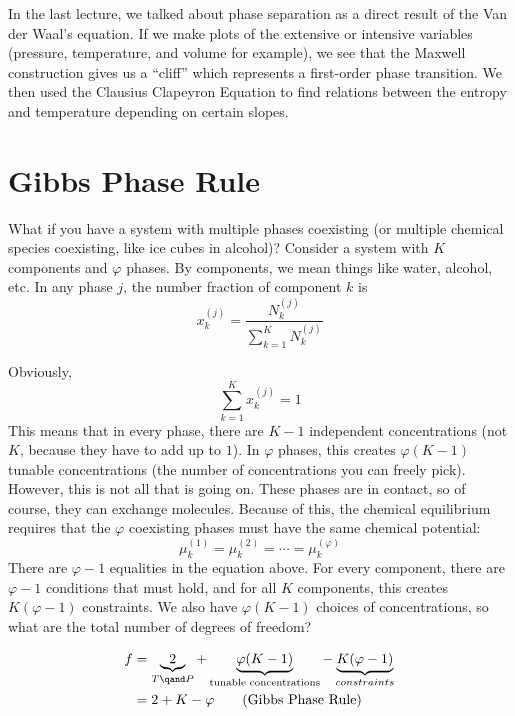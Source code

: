 \documentclass[a4paper,twoside,master.tex]{subfiles}
\begin{document}

In the last lecture, we talked about phase separation as a direct result of the Van der Waal's equation. If we make plots of the extensive or intensive variables (pressure, temperature, and volume for example), we see that the Maxwell construction gives us a ``cliff'' which represents a first-order phase transition. We then used the Clausius Clapeyron Equation to find relations between the entropy and temperature depending on certain slopes.

\section{Gibbs Phase Rule}
\label{sec:gibbs_phase_rule}

What if you have a system with multiple phases coexisting (or multiple chemical species coexisting, like ice cubes in alcohol)? Consider a system with $ K $ components and $ \varphi $ phases. By components, we mean things like water, alcohol, etc. In any phase $ j $, the number fraction of component $ k $ is
\begin{equation}
    x_k^{(j)} = \frac{N_k^{(j)}}{\sum_{k=1}^{K} N_k^{(j)}}
\end{equation}

Obviously,
\begin{equation}
    \sum_{k=1}^{K} x_k^{(j)} = 1
\end{equation}
This means that in every phase, there are $ K - 1 $ independent concentrations (not $ K $, because they have to add up to $ 1 $). In $\varphi$ phases, this creates $ \varphi (K - 1) $ tunable concentrations (the number of concentrations you can freely pick). However, this is not all that is going on. These phases are in contact, so of course, they can exchange molecules. Because of this, the chemical equilibrium requires that the $ \varphi $ coexisting phases  must have the same chemical potential:
\begin{equation}
    \mu_k^{(1)} = \mu_k^{(2)} = \cdots = \mu_k^{(\varphi)}
\end{equation}
There are $ \varphi - 1 $ equalities in the equation above. For every component, there are $ \varphi - 1 $ conditions that must hold, and for all $ K $ components, this creates $ K (\varphi - 1) $ constraints. We also have $ \varphi (K - 1) $ choices of concentrations, so what are the total number of degrees of freedom?

\begin{align}\label{eq:gibbs_phase_rule}
    f &= \underbrace{2}_{T \qand P} + \underbrace{\varphi (K - 1)}_{\text{tunable concentrations}} - \underbrace{K(\varphi - 1)}_{constraints} \\
    &= 2 + K - \varphi\tag{Gibbs Phase Rule}
\end{align}
\end{document}
